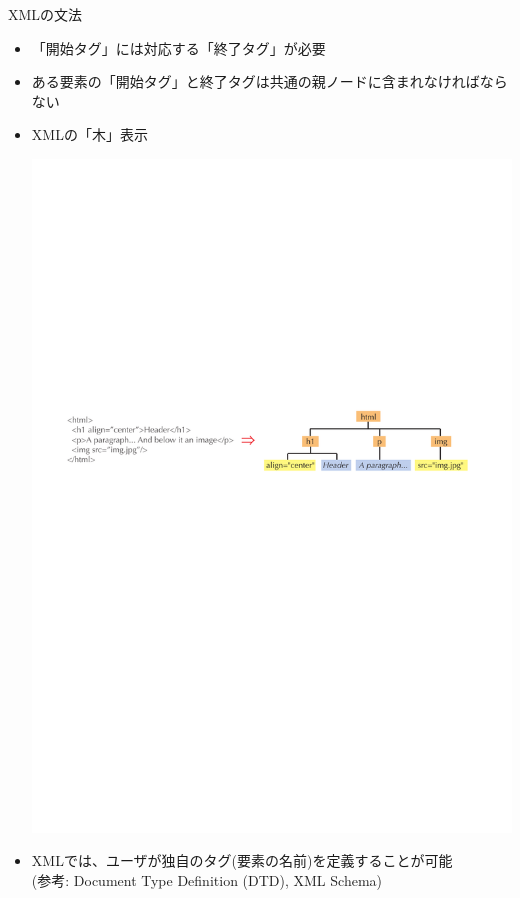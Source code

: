 \begin{frame}{XMLの文法}
  \begin{itemize}
  \item 「開始タグ」には対応する「終了タグ」が必要
  \item ある要素の「開始タグ」と終了タグは共通の親ノードに含まれなければならない
  \item XMLの「木」表示
  \begin{center}
    \includegraphics[width=\textwidth]{xml2.pdf}
  \end{center}
  \item XMLでは、ユーザが独自のタグ(要素の名前)を定義することが可能 \\
    (参考: Document Type Definition (DTD), XML Schema)
  \end{itemize}
\end{frame}

